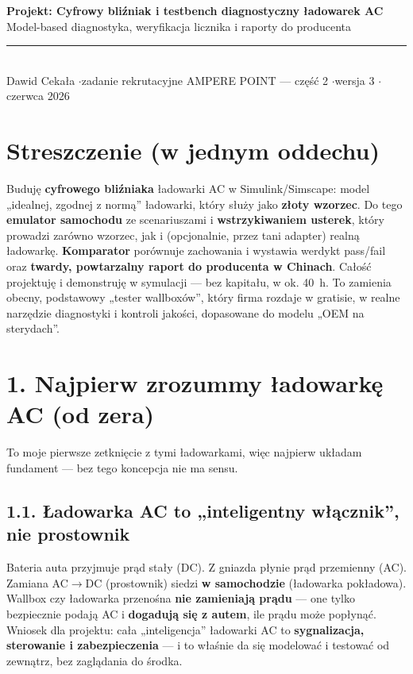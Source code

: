 \documentclass[11pt]{article}
\newcommand{\ra}{$\rightarrow$}
\newcommand{\key}[1]{\textbf{\color{navy}#1}}
\begin{document}
{\sffamily\bfseries\color{navy}\LARGE Projekt: Cyfrowy bliźniak i testbench diagnostyczny ładowarek AC}\\[3pt]
{\sffamily\large\color{navy} Model-based diagnostyka, weryfikacja licznika i raporty do producenta}\\[5pt]
{\color{rulegrey}\rule{\linewidth}{1pt}}\\[3pt]
{\sffamily\small Dawid Cekała \quad$\cdot$\quad zadanie rekrutacyjne AMPERE POINT --- część 2 \quad$\cdot$\quad wersja 3 \quad$\cdot$ czerwca 2026}

\vspace{0.7em}

\section{Streszczenie (w jednym oddechu)}

Buduję \key{cyfrowego bliźniaka} ładowarki AC w Simulink/Simscape: model „idealnej, zgodnej z normą'' ładowarki, który służy jako \key{złoty wzorzec}. Do tego \key{emulator samochodu} ze scenariuszami i \key{wstrzykiwaniem usterek}, który prowadzi zarówno wzorzec, jak i (opcjonalnie, przez tani adapter) realną ładowarkę. \key{Komparator} porównuje zachowania i wystawia werdykt pass/fail oraz \key{twardy, powtarzalny raport do producenta w Chinach}. Całość projektuję i demonstruję w symulacji --- bez kapitału, w ok. 40~h. To zamienia obecny, podstawowy „tester wallboxów'', który firma rozdaje w gratisie, w realne narzędzie diagnostyki i kontroli jakości, dopasowane do modelu „OEM na sterydach''.

\section{1. Najpierw zrozummy ładowarkę AC (od zera)}

To moje pierwsze zetknięcie z tymi ładowarkami, więc najpierw układam fundament --- bez tego koncepcja nie ma sensu.

\subsection{1.1. Ładowarka AC to „inteligentny włącznik'', nie prostownik}

Bateria auta przyjmuje prąd stały (DC). Z gniazda płynie prąd przemienny (AC). Zamiana AC\ra{}DC (prostownik) siedzi \key{w samochodzie} (ładowarka pokładowa). Wallbox czy ładowarka przenośna \key{nie zamieniają prądu} --- one tylko bezpiecznie podają AC i \key{dogadują się z autem}, ile prądu może popłynąć. Wniosek dla projektu: cała „inteligencja'' ładowarki AC to \key{sygnalizacja, sterowanie i zabezpieczenia} --- i to właśnie da się modelować i testować od zewnątrz, bez zaglądania do środka.
\end{document}
